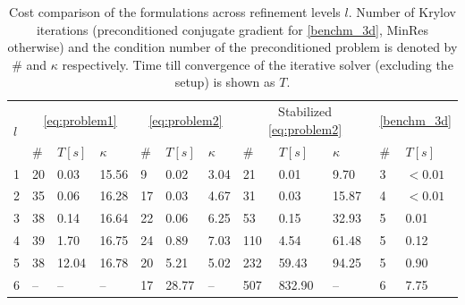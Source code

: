\documentclass[r]{siamart171218}
\begin{document}
\begin{table}
  \scriptsize{
  \begin{center}
    \begin{tabular}{l|lll|lll|lll|ll}
      \hline
      \multirow{2}{*}{$l$} & \multicolumn{3}{c|}{\eqref{eq:problem1}} & \multicolumn{3}{c|}{\eqref{eq:problem2}} & \multicolumn{3}{c|}{ Stabilized \eqref{eq:problem2}} & \multicolumn{2}{c}{\eqref{benchm_3d}}\\
      \cline{2-12}
      & \# & $T\left[s\right]$ & $\kappa$ & \# & $T\left[s\right]$ & $\kappa$ & \# & $T\left[s\right]$ & $\kappa$ & \# & $T\left[s\right]$\\
      \hline
      1 & 20 & 0.03  & 15.56 & 9  & 0.02  & 3.04 & 21  & 0.01   & 9.70  &3 & $<0.01$\\ 
      2 & 35 & 0.06  & 16.28 & 17 & 0.03  & 4.67 & 31  & 0.03   & 15.87 &4 & $<0.01$\\ 
      3 & 38 & 0.14  & 16.64 & 22 & 0.06  & 6.25 & 53  & 0.15   & 32.93 &5 & 0.01   \\ 
      4 & 39 & 1.70  & 16.75 & 24 & 0.89  & 7.03 & 110 & 4.54   & 61.48 &5 & 0.12   \\ 
      5 & 38 & 12.04 & 16.78 & 20 & 5.21  & 5.02 & 232 & 59.43  & 94.25 &5 & 0.90  \\ 
      6 & -- & --    & --    & 17 & 28.77 & --   & 507 & 832.90 & --    &6 & 7.75  \\
      \hline
    \end{tabular}
    \end{center}
    }
  \caption{Cost comparison of the formulations across refinement levels $l$.
    Number of Krylov  iterations (preconditioned conjugate gradient for \eqref{benchm_3d},
    MinRes otherwise) and the condition number of the preconditioned
    problem is denoted by $\#$ and $\kappa$ respectively. Time till convergence
    of the iterative solver (excluding the setup) is shown as $T$. 
  }
\label{tab:cost}
\end{table}
\end{document}
